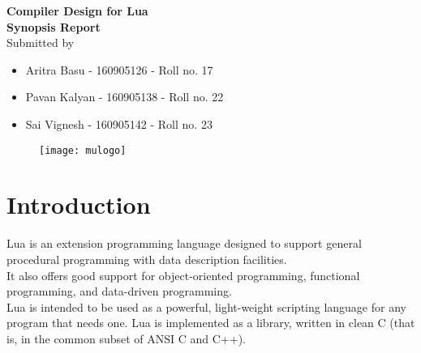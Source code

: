 \documentclass[12pt]{article}
\renewcommand{\maketitle}{
    \begin{center}
        {\Huge\bfseries Compiler Design for Lua\\[1em] Synopsis Report}\\[12em]
    {\LARGE Submitted by}\\[5em]
    \begin{itemize}
        \setlength{\itemsep}{1.2\baselineskip}
        \raggedright
        \item{\Large Aritra Basu - 160905126 - Roll no. 17}\\
        \item{\Large Pavan Kalyan - 160905138 - Roll no. 22}\\
        \item{\Large Sai Vignesh - 160905142 - Roll no. 23}\\
    \end{itemize}
    \end{center}
}
\begin{document}
\maketitle
\begin{figure}[b]
    \centering
\texttt{[image: mulogo]}
\end{figure}
\newpage
\section{Introduction}
Lua is an extension programming language designed to support general procedural programming with data description facilities.\\ It also offers good support for object-oriented programming, functional programming, and data-driven programming.\\ Lua is intended to be used as a powerful, light-weight scripting language for any program that needs one. Lua is implemented as a library, written in clean C (that is, in the common subset of ANSI C and C++).
\end{document}

